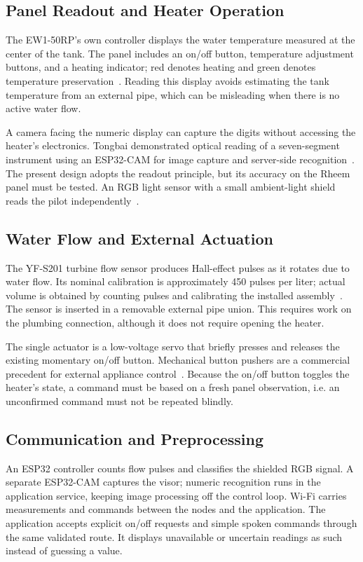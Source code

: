 \subsection{Panel Readout and Heater Operation}
The EW1-50RP's own controller displays the water temperature measured at the center of the tank. The panel includes an on/off button, temperature adjustment buttons, and a heating indicator; red denotes heating and green denotes temperature preservation~\cite{rheemmanual}. Reading this display avoids estimating the tank temperature from an external pipe, which can be misleading when there is no active water flow.

A camera facing the numeric display can capture the digits without accessing the heater's electronics. Tongbai demonstrated optical reading of a seven-segment instrument using an ESP32-CAM for image capture and server-side recognition~\cite{tongbai2024}. The present design adopts the readout principle, but its accuracy on the Rheem panel must be tested. An RGB light sensor with a small ambient-light shield reads the pilot independently~\cite{adafruitcolor}.

\subsection{Water Flow and External Actuation}
The YF-S201 turbine flow sensor produces Hall-effect pulses as it rotates due to water flow. Its nominal calibration is approximately 450 pulses per liter; actual volume is obtained by counting pulses and calibrating the installed assembly~\cite{seeedflow}. The sensor is inserted in a removable external pipe union. This requires work on the plumbing connection, although it does not require opening the heater.

The single actuator is a low-voltage servo that briefly presses and releases the existing momentary on/off button. Mechanical button pushers are a commercial precedent for external appliance control~\cite{switchbot}. Because the on/off button toggles the heater's state, a command must be based on a fresh panel observation, i.e. an unconfirmed command must not be repeated blindly.

\subsection{Communication and Preprocessing}
An ESP32 controller counts flow pulses and classifies the shielded RGB signal. A separate ESP32-CAM captures the visor; numeric recognition runs in the application service, keeping image processing off the control loop. Wi-Fi carries measurements and commands between the nodes and the application. The application accepts explicit on/off requests and simple spoken commands through the same validated route. It displays unavailable or uncertain readings as such instead of guessing a value.
